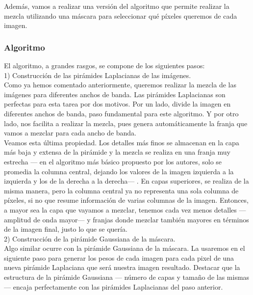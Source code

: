 \documentclass[10pt,a4paper]{article}
\theoremstyle{definition}
\begin{document}
Además, vamos a realizar una versión del algoritmo que permite realizar la mezcla utilizando una máscara para seleccionar qué píxeles queremos de cada imagen.\\

\subsubsection{Algoritmo}

El algoritmo, a grandes rasgos, se compone de los siguientes pasos:\\

1) Construcción de las pirámides Laplacianas de las imágenes.\\

Como ya hemos comentado anteriormente, queremos realizar la mezcla de las imágenes para diferentes anchos de banda. Las pirámides Laplacianas son perfectas para esta tarea por dos motivos. Por un lado, divide la imagen en diferentes anchos de banda, paso fundamental para este algoritmo. Y por otro lado, nos facilita a realizar la mezcla, pues genera automáticamente la franja que vamos a mezclar para cada ancho de banda.\\

Veamos esta última propiedad. Los detalles más finos se almacenan en la capa más baja y extensa de la pirámide y la mezcla se realiza en  una franja muy estrecha --- en el algoritmo más básico propuesto por los autores, solo se promedia la columna central, dejando los valores de la imagen izquierda a la izquierda y los de la derecha a la derecha--- . En capas superiores, se realiza de la misma manera, pero la columna central ya no representa una sola columna de píxeles, si no que resume información de varias columnas de la imagen. Entonces, a mayor sea la capa que vayamos a mezclar, tenemos cada vez menos detalles --- amplitud de onda mayor--- y franjas donde mezclar también mayores en términos de la imagen final, justo lo que se quería.\\

2) Construcción de la pirámide Gaussiana de la máscara.\\

Algo similar ocurre con la pirámide Gaussiana de la máscara. La usaremos en el siguiente paso para generar los pesos de cada imagen para cada pixel de una nueva pirámide Laplaciana que será nuestra imagen resultado. Destacar que la estructura de la pirámide Gaussiana --- número de capas y tamaño de las mismas --- encaja perfectamente con las pirámides Laplacianas del paso anterior.
\end{document}
